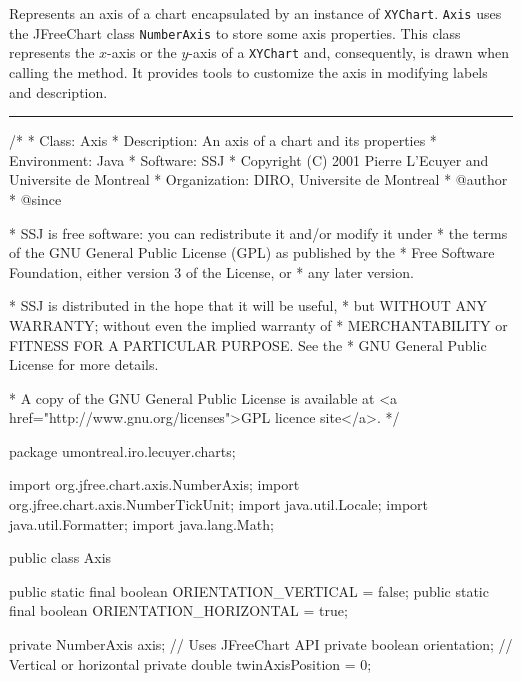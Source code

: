 
Represents an axis of a chart encapsulated by
an instance of \texttt{XYChart}.
\texttt{Axis} uses the JFreeChart class \texttt{NumberAxis}
to store some axis properties.
This class represents the $x$-axis or the $y$-axis of a \texttt{XYChart}
and, consequently,  is drawn when calling the  method.
It provides tools to customize the axis in modifying labels and description.

\bigskip\hrule
\begin{code}
\begin{hide}
/*
 * Class:        Axis
 * Description:  An axis of a chart and its properties
 * Environment:  Java
 * Software:     SSJ 
 * Copyright (C) 2001  Pierre L'Ecuyer and Universite de Montreal
 * Organization: DIRO, Universite de Montreal
 * @author       
 * @since

 * SSJ is free software: you can redistribute it and/or modify it under
 * the terms of the GNU General Public License (GPL) as published by the
 * Free Software Foundation, either version 3 of the License, or
 * any later version.

 * SSJ is distributed in the hope that it will be useful,
 * but WITHOUT ANY WARRANTY; without even the implied warranty of
 * MERCHANTABILITY or FITNESS FOR A PARTICULAR PURPOSE.  See the
 * GNU General Public License for more details.

 * A copy of the GNU General Public License is available at
   <a href="http://www.gnu.org/licenses">GPL licence site</a>.
 */
\end{hide}
package umontreal.iro.lecuyer.charts;\begin{hide}

import org.jfree.chart.axis.NumberAxis;
import org.jfree.chart.axis.NumberTickUnit;
import java.util.Locale;
import java.util.Formatter;
import java.lang.Math;\end{hide}


public class Axis \begin{hide} {
   \end{hide}

   public static final boolean ORIENTATION_VERTICAL = false;
   public static final boolean ORIENTATION_HORIZONTAL = true;\begin{hide}

   private NumberAxis axis;        // Uses JFreeChart API
   private boolean orientation;    // Vertical or horizontal
   private double twinAxisPosition = 0;


\end{hide}
\end{code}

